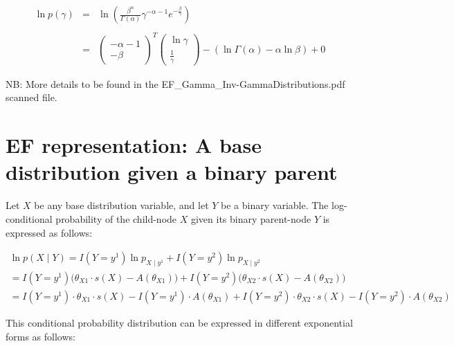 \documentclass[11pt, oneside]{article}   	%
\numberwithin{figure}{section}
\numberwithin{equation}{section}
\numberwithin{table}{section}
\theoremstyle{definition}
\begin{document}
\begin{appendices}
\begin{eqnarray*}
\ln p(\gamma) &=& \ln \left( \frac{\beta^{\alpha}}{\Gamma(\alpha)} \gamma^{-\alpha-1} e^{-\frac{\beta}{\gamma}} \right)\\\\
&=&
\begin{pmatrix}
-\alpha - 1\\
-\beta
\end{pmatrix}^T
\begin{pmatrix}
\ln \gamma \\
\frac{1}{\gamma}
\end{pmatrix}
- \left(\ln{\Gamma(\alpha)} - \alpha \ln{\beta}\right) + 0
\end{eqnarray*}

NB: More details to be found in the EF\_Gamma\_Inv-GammaDistributions.pdf scanned file.

\newpage



\section{EF representation: A base distribution given a binary parent}

Let $X$ be any base distribution variable, and let $Y$ be a binary variable. The log-conditional probability of the child-node $X$ given its binary parent-node $Y$ is expressed as follows:

\begin{eqnarray*}
\ln p(X \mid Y) =  I(Y= y^1) \ln p_{X \mid y^1} + I(Y= y^2) \ln p_{X \mid y^2} ~~~~~~~~~~~~~~~~~~~~~~~~~~~~~~~~~~~~~~~~~~~~~~~~~~~~~\\
= I(Y= y^1)  \Big(\theta_{X1} \cdot s(X) - A(\theta_{X1})\Big) +  I(Y= y^2) \Big(\theta_{X2} \cdot s(X) - A(\theta_{X2})\Big) ~~~~~~~~~~~~~~~~~~~~~~~~~~~~\\
= I(Y=y^1) \cdot \theta_{X1} \cdot s(X) - I(Y=y^1) \cdot A(\theta_{X1}) +  I(Y=y^2) \cdot \theta_{X2} \cdot s(X) - I(Y=y^2) \cdot A(\theta_{X2})
\end{eqnarray*}

This conditional probability distribution can be expressed in different exponential forms as follows:

\begin{itemize}


\end{itemize}
\end{appendices}
\end{document}
